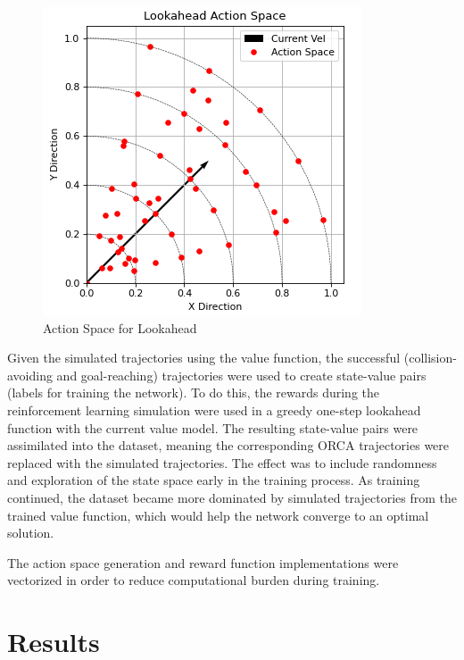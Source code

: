 \documentclass[conference]{IEEEtran}
\begin{document}
\begin{figure}[h!]
    \centering
    \includegraphics[width=0.9\linewidth]{docs/latex/figures/action_space.PNG}
    \caption{Action Space for Lookahead}
    \label{fig:actionspace}
\end{figure}

Given the simulated trajectories using the value function, the successful (collision-avoiding and goal-reaching) trajectories were used to create state-value pairs (labels for training the network). To do this, the rewards during the reinforcement learning simulation were used in a greedy one-step lookahead function with the current value model. The resulting state-value pairs were assimilated into the dataset, meaning the corresponding ORCA trajectories were replaced with the simulated trajectories. The effect was to include randomness and exploration of the state space early in the training process. As training continued, the dataset became more dominated by simulated trajectories from the trained value function, which would help the network converge to an optimal solution.

The action space generation and reward function implementations were vectorized in order to reduce computational burden during training.

\section{Results}
\end{document}

